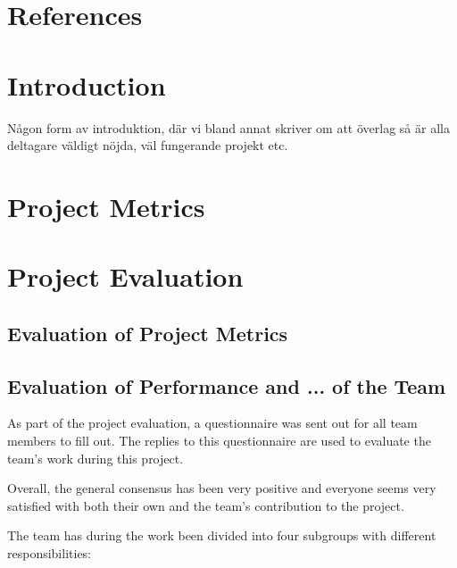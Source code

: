 \documentclass[a4paper]{article}
\begin{document}
\section{References}

\section{Introduction}
Någon form av introduktion, där vi bland annat skriver om att överlag så är alla deltagare väldigt nöjda, väl fungerande projekt etc. 

\section{Project Metrics}



\section{Project Evaluation}

\subsection{Evaluation of Project Metrics}




\subsection{Evaluation of Performance and ... of the Team}
As part of the project evaluation, a questionnaire was sent out for all team members to fill out. The replies to this questionnaire are used to evaluate the team's work during this project.

Overall, the general consensus has been very positive and everyone seems very satisfied with both their own and the team's contribution to the project.

The team has during the work been divided into four subgroups with different responsibilities:
\end{document}
